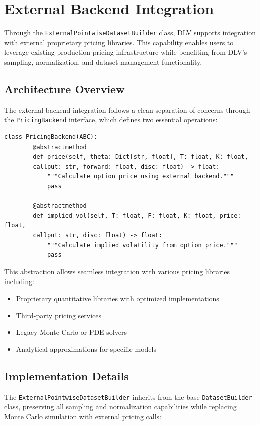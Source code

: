 	\section{External Backend Integration}
	\label{sec:external-backend}
	
	Through the \texttt{ExternalPointwiseDatasetBuilder} class, DLV supports integration with external proprietary pricing libraries. This capability enables users to leverage existing production pricing infrastructure while benefiting from DLV's sampling, normalization, and dataset management functionality.
	
	\subsection{Architecture Overview}
	
	The external backend integration follows a clean separation of concerns through the \texttt{PricingBackend} interface, which defines two essential operations:
	
	\begin{lstlisting}[style=cleanpy]
		class PricingBackend(ABC):
		@abstractmethod
		def price(self, theta: Dict[str, float], T: float, K: float, 
		callput: str, forward: float, disc: float) -> float:
			"""Calculate option price using external backend."""
			pass
		
		@abstractmethod  
		def implied_vol(self, T: float, F: float, K: float, price: float,
		callput: str, disc: float) -> float:
			"""Calculate implied volatility from option price."""
			pass
	\end{lstlisting}
	
	This abstraction allows seamless integration with various pricing libraries including:
	\begin{itemize}[nosep]
		\item Proprietary quantitative libraries with optimized implementations
		\item Third-party pricing services
		\item Legacy Monte Carlo or PDE solvers
		\item Analytical approximations for specific models
	\end{itemize}
	
	\subsection{Implementation Details}
	
	The \texttt{ExternalPointwiseDatasetBuilder} inherits from the base \texttt{DatasetBuilder} class, preserving all sampling and normalization capabilities while replacing Monte Carlo simulation with external pricing calls:
	
